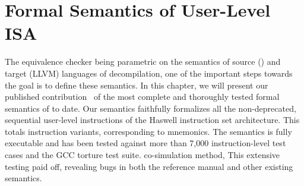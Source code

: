 \chapter{Formal Semantics of \ISA User-Level ISA}\label{sec:results}

The equivalence checker being parametric on the semantics of source (\ISA) and
target (LLVM) languages of decompilation, one of the important steps towards
the goal is to define these semantics. In this chapter, we will present our
published contribution~\cite{DasguptaAdve:PLDI19} of the most complete and
thoroughly tested formal semantics of \ISA to date.  Our semantics faithfully
formalizes all the non-deprecated, sequential user-level instructions of the
\ISA Haswell instruction set architecture.  This totals \currentIS{}
instruction variants, corresponding to \currentIntel{} mnemonics. %
The semantics is fully executable and has been tested against more than 7,000
instruction-level test cases and the GCC torture test suite. %
co-simulation method, This extensive testing paid off, revealing bugs in both
the \ISA reference manual and other existing semantics.  










%
